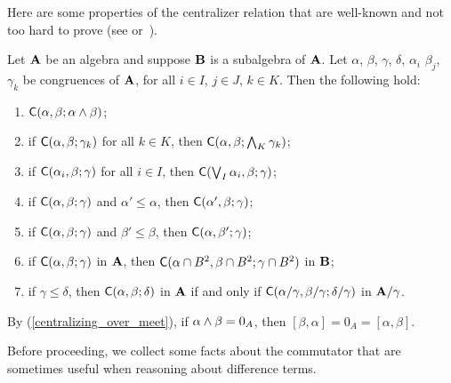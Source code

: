 Here are some properties of the centralizer relation
that are well-known and not too hard to prove
(see \cite[Prop~3.4]{HM:1988} or~\cite[Thm~2.19]{MR3076179}).
\begin{lem}
\label{lem:centralizers}
Let $\mathbf{A}$ be an algebra and suppose
$\mathbf{B}$ is a subalgebra of $\mathbf{A}$. 
Let $\alpha$, $\beta$, $\gamma$, $\delta$, $\alpha_i$
$\beta_j$, $\gamma_k$
be congruences of $\mathbf{A}$, for all 
$i \in I$, $j\in J$, $k \in K$. Then the following hold:
\begin{enumerate}
\item \label{centralizing_over_meet}
  $\mathsf{C}(\alpha, \beta; \alpha \wedge \beta)$;
\item \label{centralizing_over_meet2}
  if $\mathsf{C}(\alpha,  \beta;  \gamma_k)$ for all $k \in K$, then
  $\mathsf{C}(\alpha,  \beta;  \bigwedge_{K}\gamma_k)$;
\item \label{centralizing_over_join1}
  if $\mathsf{C}(\alpha_i,  \beta;  \gamma)$ for all $i\in I$, then
  $\mathsf{C}(\bigvee_{I}\alpha_i,  \beta; \gamma)$;
\item \label{monotone_centralizers1}
  if $\mathsf{C}(\alpha,  \beta;  \gamma)$ and $\alpha' \leq \alpha$, then 
  $\mathsf{C}(\alpha',  \beta;  \gamma)$;
\item \label{monotone_centralizers2}
  if $\mathsf{C}(\alpha,  \beta;  \gamma)$ and $\beta' \leq \beta$, then
  $\mathsf{C}(\alpha,  \beta';  \gamma)$;
\item \label{centralizing_over_subalg}
  if $\mathsf{C}(\alpha,  \beta;  \gamma)$ in $\mathbf{A}$, 
  then $\mathsf{C}(\alpha\cap B^2,  \beta\cap B^2; \gamma\cap B^2)$ in $\mathbf{B}$;
\item \label{centralizing_factors}
  if $\gamma \leq \delta$, then $\mathsf{C}(\alpha,  \beta;  \delta)$
  in $\mathbf{A}$ if and only if $\mathsf{C}(\alpha/\gamma,  \beta/\gamma;  \delta/\gamma)$
  in $\mathbf{A}/\gamma$.
\end{enumerate}
\end{lem}


\begin{rem}
By (\ref{centralizing_over_meet}), 
if $\alpha \wedge \beta = 0_{A}$,  
then %
$[\beta, \alpha] = 0_A = [\alpha, \beta]$.
\end{rem}


Before proceeding, we collect some facts about the commutator that are
sometimes useful when reasoning about difference terms.


